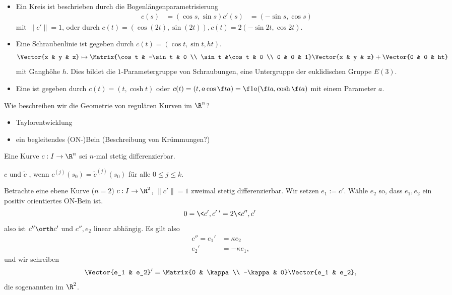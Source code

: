 \begin{ex}
	\begin{itemize}
		\item
			Ein Kreis ist beschrieben durch die Bogenlängenparametrisierung
			\begin{align*}
				c(s) &= (\cos s, \sin s)
				c'(s) &= (-\sin s, \cos s)
			\end{align*}
			mit $\|c'\| = 1$, oder durch $c(t) = (\cos (2t), \sin(2t)), \dot c(t) = 2(-\sin 2t, \cos 2t)$.
		\item
			Eine Schraubenlinie ist gegeben durch $c(t) = (\cos t, \sin t, ht)$.
			\[
				\Vector{x & y & z}
				\mapsto
				\Matrix{\cos t & -\sin t & 0 \\ \sin t &\cos t & 0 \\ 0 & 0 & 1}
				\Vector{x & y & z}
				+ \Vector{0 & 0 & ht}
			\]
			mit Ganghöhe $h$.
			Dies bildet die $1$-Parametergruppe von Schraubungen, eine Untergruppe der euklidischen Gruppe $E(3)$.
		\item
			Eine  ist gegeben durch $c(t) = (t, \cosh t)$ oder $c(t) = (t, a \cos \f ta) = \f 1a (\f ta, \cosh \f ta)$ mit einem Parameter $a$.
	\end{itemize}
\end{ex}

Wie beschreiben wir die Geometrie von regulären Kurven im $\R^n$?
\begin{itemize}
	\item
		Taylorentwicklung
	\item
		ein begleitendes (ON-)Bein (Beschreibung von Krümmungen?)
\end{itemize}

Eine Kurve $c: I \to \R^n$ sei $n$-mal stetig differenzierbar.

\begin{df}
	$c$ und $\tilde c$ , wenn $c^{(j)}(s_0) = \tilde c^{(j)}(s_0)$ für alle $0 \le j \le k$.
\end{df}


Betrachte eine ebene Kurve ($n=2$) $c: I \to \R^2$, $\|c'\| = 1$ zweimal stetig differenzierbar.
Wir setzen $e_1 := c'$.
Wähle $e_2$ so, dass $e_1, e_2$ ein positiv orientiertes ON-Bein ist.
\[
	0
	= \<c', c'\>'
	= 2 \<c'', c'\>
\]
also ist $c'' \orth c'$ und $c'', e_2$ linear abhängig.
Es gilt also
\begin{align*}
	c'' = e_1' &= \kappa e_2 \\
	e_2' &= -\kappa e_1,
\end{align*}
und wir schreiben
\[
	\Vector{e_1 & e_2}'
	= \Matrix{0 & \kappa \\ -\kappa & 0}
	\Vector{e_1 & e_2},
\]
die sogenannten  im $\R^2$.

